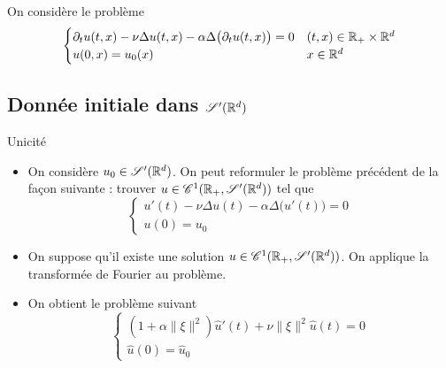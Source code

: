 \begin{frame}
    On considère le problème
\begin{equation*}
    \begin{cases}
        \partial_tu(t,x) - \nu\Delta u(t,x) - \alpha\Delta \big(\partial_t u(t,x)\big) = 0 & (t,x) \in \mathbb R_+ \times \mathbb{R}^d  \\
        u(0,x) = u_0(x) & x \in \mathbb{R}^d
    \end{cases}
\end{equation*}
\end{frame}

\subsection{Donnée initiale dans \texorpdfstring{$\mathscr{S}'(\mathbb{R}^d)$}{S'(Rd)}}
\begin{frame}{Unicité}
\begin{itemize}
\item On considère $u_0 \in \mathscr{S}'(\mathbb{R}^d)$. On peut reformuler le 
problème précédent de la façon suivante : trouver $u \in 
\mathscr{C}^1(\mathbb{R}_+, \mathscr{S}'(\mathbb{R}^d))$ tel que
\begin{equation}\label{pb_RS4}
    \begin{cases}
        u'(t) - \nu\Delta u(t) - \alpha\Delta \big(u'(t)\big) = 0  \\
        u(0) = u_0
    \end{cases}
\end{equation}
\item On suppose qu'il existe une solution 
$u \in \mathscr{C}^1(\mathbb{R}_+,\mathscr{S}'(\mathbb{R}^d))$. On applique la 
transformée de Fourier au problème.%
\item On obtient le problème suivant
\begin{equation}\label{pb_RS_Fourier}
    \begin{cases}
        (1+\alpha\|\xi\|^2)\hat{u}'(t)+\nu\|\xi\|^2\hat{u}(t) = 0  \\
        \hat{u}(0) = \hat{u}_0
    \end{cases}
\end{equation}
\end{itemize}
\end{frame}

